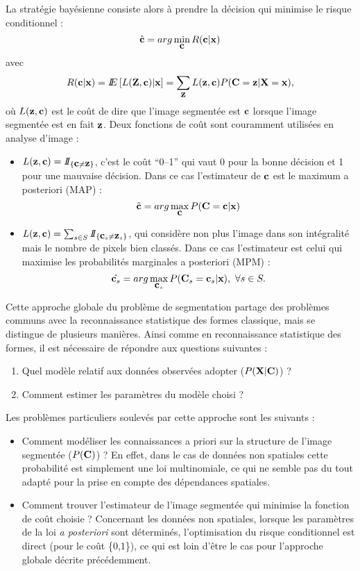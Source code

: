La strat\'egie bay\'esienne consiste alors \`a  prendre
la d\'ecision qui minimise  le risque conditionnel :
\[
\hat{\mbox{\bf c}}= arg \min_{\mbox{\bf c}} R( \mbox{\bf c} | \mbox{\bf x})
\]
avec
\[
R( \mbox{\bf c} | \mbox{\bf x})=I\!\!E \left[ L(\mbox{\bf Z}, \mbox{\bf c})|\mbox{\bf x} \right ] =
\sum_{\mbox{\bf z}}  L(\mbox{\bf z}, \mbox{\bf c}) P(\mbox{\bf C}=\mbox{\bf z} | \mbox{\bf X}=\mbox{\bf x}),
\]
o\`u $L(\mbox{\bf z}, \mbox{\bf c})$ est le co\^ut de dire que l'image segment\'ee est $\mbox{\bf c}$ 
lorsque l'image segment\'ee est en fait $\mbox{\bf z}$. Deux fonctions de co\^ut
sont couramment utilis\'ees en analyse d'image :
\begin{itemize}
\item $L(\mbox{\bf z}, \mbox{\bf c})=I\!\!I_{\{\mbox{\bf c} \neq \mbox{\bf z} \}}$, c'est le co\^ut ``0--1'' qui vaut 0 pour la
bonne d\'ecision et 1 pour une mauvaise d\'ecision. Dans ce cas l'estimateur
de $\mbox{\bf c}$ est le maximum a posteriori (MAP) :
\[
\hat{\mbox{\bf c}}= arg\max_{\mbox{\bf c}} P( \mbox{\bf C}=\mbox{\bf c} | \mbox{\bf x})
\]
\item $L(\mbox{\bf z}, \mbox{\bf c})=\sum_{s \in S} I\!\!I_{\{\mbox{\bf c}_s \neq \mbox{\bf z}_s \}}$, qui consid\`ere non plus
l'image dans son int\'egralit\'e mais le nombre de pixels bien class\'es. Dans
ce cas l'estimateur est celui qui maximise les probabilit\'es marginales 
a posteriori (MPM) \cite{Marroquin1987}:
\[
\hat{\mbox{\bf c}_s}= arg\max_{\mbox{\bf c}_s} P( \mbox{\bf C}_s=\mbox{\bf c}_s | \mbox{\bf x}), \ \forall s \in S.
\]
\end{itemize}

Cette approche globale du probl\`eme de segmentation partage des probl\`emes
communs avec la reconnaissance statistique des formes classique, mais se
distingue de plusieurs mani\`eres. Ainsi comme en reconnaissance statistique
des formes, il est n\'ecessaire de r\'epondre aux questions suivantes :
\begin{enumerate}
\item Quel  mod\`ele relatif aux donn\'ees observ\'ees adopter 
($P(\mbox{\bf X} | \mbox{\bf C})$) ?
\item Comment estimer les param\`etres du mod\`ele choisi ?
\end{enumerate}
Les probl\`emes particuliers soulev\'es par cette approche sont les 
suivants :
\begin{itemize}
\item
Comment mod\'eliser les connaissances a priori sur la structure 
de l'image segment\'ee ($P(\mbox{\bf C})$) ? En effet, dans le cas de donn\'ees non 
spatiales cette  probabilit\'e est simplement une loi multinomiale,
ce qui ne semble pas du tout adapt\'e pour la prise en compte
des d\'ependances spatiales.
\item
Comment trouver l'estimateur de l'image segment\'ee qui
minimise la fonction de co\^ut choisie ? Concernant les donn\'ees
non spatiales, lorsque les param\`etres de la loi {\em a posteriori}
sont d\'etermin\'es, l'optimisation du risque conditionnel est direct
(pour le co\^ut \{0,1\}), ce qui est loin d'\^etre le cas pour
l'approche globale d\'ecrite pr\'ec\'edemment.  
\end{itemize}

